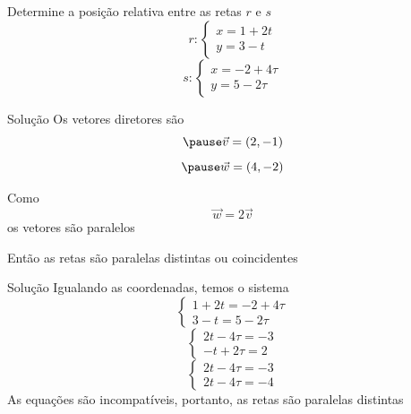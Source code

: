 \begin{question}
  Determine a posição relativa entre as retas $r$ e $s$
  \[
    r\colon
    \begin{cases}
      x = 1+2t \\
      y = 3-t
    \end{cases}
  \]
  \[
    s\colon
    \begin{cases}
      x = -2 + 4\tau \\
      y =  5 - 2\tau
    \end{cases}
  \]

\end{question}

\begin{resolution}{Solução}
  Os vetores diretores são
  \[
    \pause
    \vec v=(2,-1)
  \]
  \[
    \pause
    \vec w=(4,-2)
  \]

  \pause
  Como
  \[
    \vec w = 2\vec v
  \]
  \pause
  os vetores são paralelos

  \pause
  Então as retas são paralelas distintas ou coincidentes
\end{resolution}

\begin{resolution}{Solução}
  Igualando as coordenadas,
  \pause
  temos o sistema
  \[
    \begin{cases}
      1+2t = -2+4\tau \\
      3-t  = 5-2\tau
    \end{cases}
  \]
  \pause
  \[
    \begin{cases}
      2t -4\tau = -3 \\
      -t +2\tau =  2
    \end{cases}
  \]
  \pause
  \[
    \begin{cases}
      2t -4\tau = -3 \\
      2t -4\tau = -4
    \end{cases}
  \]
  \pause
  As equações são incompatíveis,
  \pause
  portanto, as retas são paralelas distintas
\end{resolution}

